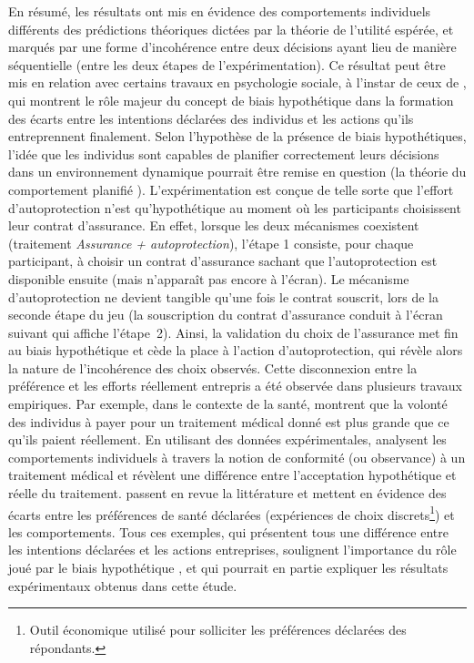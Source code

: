 \begin{Article}
\begin{refsection}[Mouminoux]
En résumé, les résultats ont mis en évidence des comportements individuels différents des prédictions théoriques dictées par la théorie de l'utilité espérée, et marqués par une forme d'incohérence entre deux décisions ayant lieu de manière séquentielle (entre les deux étapes de l'expérimentation). Ce résultat peut être mis en relation avec certains travaux en psychologie sociale, à l'instar de ceux de \textcite{abc04}, qui montrent le rôle majeur du concept de biais hypothétique dans la formation des écarts entre les intentions déclarées des individus et les actions qu'ils entreprennent finalement. Selon l'hypothèse de la présence de biais hypothétiques, l'idée que les individus sont capables de planifier correctement leurs décisions dans un environnement dynamique pourrait être remise en question (la théorie du comportement planifié \parencite{Ajzen1991}). L'expérimentation est conçue de telle sorte que l'effort d'autoprotection n'est qu'hypothétique au moment où les participants choisissent leur contrat d'assurance. En effet, lorsque les deux mécanismes coexistent (traitement \textit{Assurance + autoprotection}), l'étape 1 consiste, pour chaque participant, à choisir un contrat d'assurance sachant que l'autoprotection est disponible ensuite (mais n'apparaît pas encore à l'écran). Le mécanisme d'autoprotection ne devient tangible qu'une fois le contrat souscrit, lors de la seconde étape du jeu (la souscription du contrat d'assurance conduit à l'écran suivant qui affiche l'étape~2). Ainsi, la validation du choix de l'assurance met fin au biais hypothétique et cède la place à l'action d'autoprotection, qui révèle alors la nature de l'incohérence des choix observés. Cette disconnexion entre la préférence et les efforts réellement entrepris a été observée dans plusieurs travaux empiriques. Par exemple, dans le contexte de la santé, \textcite{öjh09} montrent que la volonté des individus à payer pour un traitement médical donné est plus grande que ce qu'ils paient réellement. En utilisant des données expérimentales, \textcite{ms04} analysent les comportements individuels à travers la notion de conformité (ou observance) à un traitement médical et révèlent une différence entre l'acceptation hypothétique et réelle du traitement. \textcite{qtdv18} passent en revue la littérature et mettent en évidence des écarts entre les préférences de santé déclarées (expériences de choix discrets\footnote{Outil économique utilisé pour solliciter les préférences déclarées des répondants.}) et les comportements. Tous ces exemples, qui présentent tous une différence entre les intentions déclarées et les actions entreprises, soulignent l'importance du rôle joué par le biais hypothétique \parencite{hrg15}, et qui pourrait en partie expliquer les résultats expérimentaux obtenus dans cette étude.



\end{refsection}
\end{Article}
